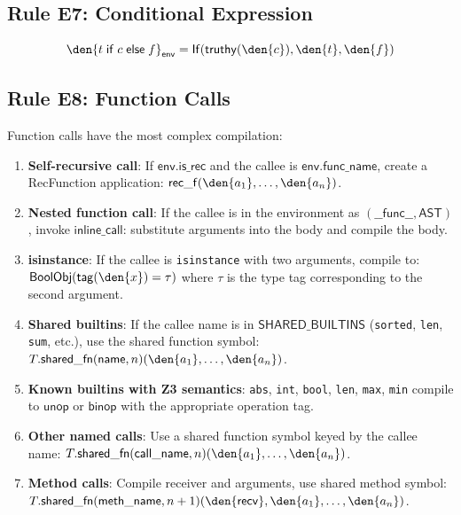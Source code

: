 \subsection{Rule E7: Conditional Expression}
\[
  \den{t \;\mathsf{if}\; c \;\mathsf{else}\; f}_\mathsf{env} =
    \mathsf{If}(\mathsf{truthy}(\den{c}), \den{t}, \den{f})
\]

\subsection{Rule E8: Function Calls}

Function calls have the most complex compilation:

\begin{enumerate}
  \item \textbf{Self-recursive call}: If $\mathsf{env.is\_rec}$ and the
    callee is $\mathsf{env.func\_name}$, create a RecFunction
    application: $\mathsf{rec\_f}(\den{a_1}, \ldots, \den{a_n})$.

  \item \textbf{Nested function call}: If the callee is in the
    environment as $(\mathsf{\_\_func\_\_}, \mathsf{AST})$, invoke
    $\mathsf{inline\_call}$: substitute arguments into the body and
    compile the body.

  \item \textbf{isinstance}: If the callee is \texttt{isinstance} with
    two arguments, compile to:
    $\mathsf{BoolObj}(\mathsf{tag}(\den{x}) = \tau)$ where $\tau$
    is the type tag corresponding to the second argument.

  \item \textbf{Shared builtins}: If the callee name is in
    $\mathsf{SHARED\_BUILTINS}$ (\texttt{sorted}, \texttt{len},
    \texttt{sum}, etc.), use the shared function symbol:
    $T.\mathsf{shared\_fn}(\mathsf{name}, n)(\den{a_1}, \ldots,
    \den{a_n})$.

  \item \textbf{Known builtins with Z3 semantics}: \texttt{abs},
    \texttt{int}, \texttt{bool}, \texttt{len}, \texttt{max},
    \texttt{min} compile to $\mathsf{unop}$ or $\mathsf{binop}$
    with the appropriate operation tag.

  \item \textbf{Other named calls}: Use a shared function symbol
    keyed by the callee name: $T.\mathsf{shared\_fn}(\mathsf{call\_name},
    n)(\den{a_1}, \ldots, \den{a_n})$.

  \item \textbf{Method calls}: Compile receiver and arguments, use
    shared method symbol:
    $T.\mathsf{shared\_fn}(\mathsf{meth\_name}, n+1)(\den{\mathsf{recv}},
    \den{a_1}, \ldots, \den{a_n})$.
\end{enumerate}

